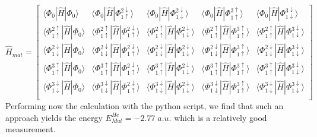 \documentclass{article}
\begin{document}
\begin{equation}
\hat H_{mat} = 
\begin{bmatrix}
\langle \Phi_0 | \hat H | \Phi_0 \rangle & 
\langle \Phi_{0} | \hat H | \Phi_{1\uparrow}^{2\downarrow} \rangle &
\langle \Phi_0 | \hat H | \Phi_{1\downarrow}^{2\downarrow} \rangle & 
\langle \Phi_0 | \hat H | \Phi_{1\uparrow}^{3\uparrow} \rangle &
\langle \Phi_0 | \hat H | \Phi_{1\downarrow}^{3\downarrow} \rangle \\

\langle \Phi_{1\uparrow}^{2\uparrow} | \hat H | \Phi_0 \rangle & 
\langle \Phi_{1\uparrow}^{2\uparrow} | \hat H | \Phi_{1\uparrow}^{2\downarrow} \rangle &
\langle \Phi_{1\uparrow}^{2\uparrow} | \hat H | \Phi_{1\downarrow}^{2\downarrow} \rangle & 
\langle \Phi_{1\uparrow}^{2\uparrow} | \hat H | \Phi_{1\uparrow}^{3\uparrow} \rangle &
\langle \Phi_{1\uparrow}^{2\uparrow} | \hat H | \Phi_{1\downarrow}^{3\downarrow} \rangle \\

\langle \Phi_{1\downarrow}^{2\downarrow} | \hat H | \Phi_0 \rangle & 
\langle \Phi_{1\downarrow}^{2\downarrow} | \hat H | \Phi_{1\uparrow}^{2\downarrow} \rangle &
\langle \Phi_{1\downarrow}^{2\downarrow} | \hat H | \Phi_{1\downarrow}^{2\downarrow} \rangle & 
\langle \Phi_{1\downarrow}^{2\downarrow} | \hat H | \Phi_{1\uparrow}^{3\uparrow} \rangle &
\langle \Phi_{1\downarrow}^{2\downarrow} | \hat H | \Phi_{1\downarrow}^{3\downarrow} \rangle \\

\langle \Phi_{1\uparrow}^{3\uparrow} | \hat H | \Phi_0 \rangle & 
\langle \Phi_{1\uparrow}^{3\uparrow} | \hat H | \Phi_{1\uparrow}^{2\downarrow} \rangle &
\langle \Phi_{1\uparrow}^{3\uparrow} | \hat H | \Phi_{1\downarrow}^{2\downarrow} \rangle & 
\langle \Phi_{1\uparrow}^{3\uparrow} | \hat H | \Phi_{1\uparrow}^{3\uparrow} \rangle &
\langle \Phi_{1\uparrow}^{3\uparrow} | \hat H | \Phi_{1\downarrow}^{3\downarrow} \rangle \\

\langle \Phi_{1\downarrow}^{3\downarrow} | \hat H | \Phi_0 \rangle & 
\langle \Phi_{1\downarrow}^{3\downarrow} | \hat H | \Phi_{1\uparrow}^{2\downarrow} \rangle &
\langle \Phi_{1\downarrow}^{3\downarrow} | \hat H | \Phi_{1\downarrow}^{2\downarrow} \rangle & 
\langle \Phi_{1\downarrow}^{3\downarrow} | \hat H | \Phi_{1\uparrow}^{3\uparrow} \rangle &
\langle \Phi_{1\downarrow}^{3\downarrow} | \hat H | \Phi_{1\downarrow}^{3\downarrow} \rangle \\
\end{bmatrix}
\end{equation}
Performing now the calculation with the python script, we find that such an approach yields the energy $E^{He}_{Mat} = -2.77\; a.u.$ which is a relatively good measurement.
\end{document}
